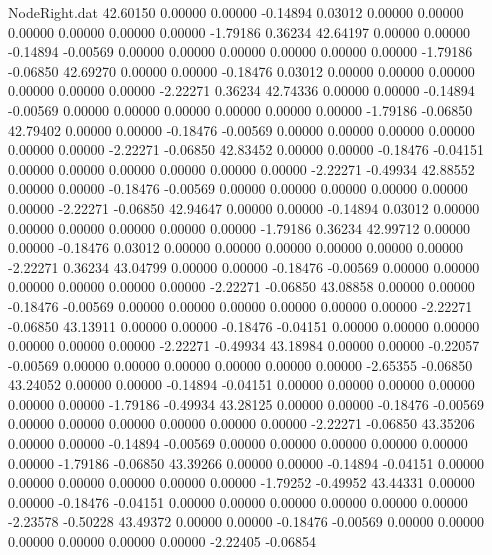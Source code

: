 \begin{filecontents}{NodeRight.dat}
  42.60150    0.00000    0.00000    -0.14894    0.03012    0.00000    0.00000    0.00000    0.00000    0.00000    0.00000   -1.79186    0.36234
  42.64197    0.00000    0.00000    -0.14894   -0.00569    0.00000    0.00000    0.00000    0.00000    0.00000    0.00000   -1.79186   -0.06850
  42.69270    0.00000    0.00000    -0.18476    0.03012    0.00000    0.00000    0.00000    0.00000    0.00000    0.00000   -2.22271    0.36234
  42.74336    0.00000    0.00000    -0.14894   -0.00569    0.00000    0.00000    0.00000    0.00000    0.00000    0.00000   -1.79186   -0.06850
  42.79402    0.00000    0.00000    -0.18476   -0.00569    0.00000    0.00000    0.00000    0.00000    0.00000    0.00000   -2.22271   -0.06850
  42.83452    0.00000    0.00000    -0.18476   -0.04151    0.00000    0.00000    0.00000    0.00000    0.00000    0.00000   -2.22271   -0.49934
  42.88552    0.00000    0.00000    -0.18476   -0.00569    0.00000    0.00000    0.00000    0.00000    0.00000    0.00000   -2.22271   -0.06850
  42.94647    0.00000    0.00000    -0.14894    0.03012    0.00000    0.00000    0.00000    0.00000    0.00000    0.00000   -1.79186    0.36234
  42.99712    0.00000    0.00000    -0.18476    0.03012    0.00000    0.00000    0.00000    0.00000    0.00000    0.00000   -2.22271    0.36234
  43.04799    0.00000    0.00000    -0.18476   -0.00569    0.00000    0.00000    0.00000    0.00000    0.00000    0.00000   -2.22271   -0.06850
  43.08858    0.00000    0.00000    -0.18476   -0.00569    0.00000    0.00000    0.00000    0.00000    0.00000    0.00000   -2.22271   -0.06850
  43.13911    0.00000    0.00000    -0.18476   -0.04151    0.00000    0.00000    0.00000    0.00000    0.00000    0.00000   -2.22271   -0.49934
  43.18984    0.00000    0.00000    -0.22057   -0.00569    0.00000    0.00000    0.00000    0.00000    0.00000    0.00000   -2.65355   -0.06850
  43.24052    0.00000    0.00000    -0.14894   -0.04151    0.00000    0.00000    0.00000    0.00000    0.00000    0.00000   -1.79186   -0.49934
  43.28125    0.00000    0.00000    -0.18476   -0.00569    0.00000    0.00000    0.00000    0.00000    0.00000    0.00000   -2.22271   -0.06850
  43.35206    0.00000    0.00000    -0.14894   -0.00569    0.00000    0.00000    0.00000    0.00000    0.00000    0.00000   -1.79186   -0.06850
  43.39266    0.00000    0.00000    -0.14894   -0.04151    0.00000    0.00000    0.00000    0.00000    0.00000    0.00000   -1.79252   -0.49952
  43.44331    0.00000    0.00000    -0.18476   -0.04151    0.00000    0.00000    0.00000    0.00000    0.00000    0.00000   -2.23578   -0.50228
  43.49372    0.00000    0.00000    -0.18476   -0.00569    0.00000    0.00000    0.00000    0.00000    0.00000    0.00000   -2.22405   -0.06854

\end{filecontents}
